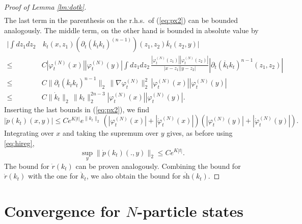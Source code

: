 \documentclass[11pt,a4paper]{article}
\newcommand{\ph}{\varphi_t^{(N)}}	%
\newcommand{\phdot}{\dot{\varphi}_t^{(N)}}	%
\begin{document}
\begin{proof}[Proof of Lemma \ref{lm:dotk}]
\[\begin{split}
 \end{split}
\]
The last term in the parenthesis on the r.h.s.\ of (\ref{eq:px2}) can be bounded analogously. 
The middle term, on the other hand is bounded in absolute value by
\[ \begin{split}
\Big|  \int dz_1 dz_2 & \, k_t (x,z_1) (\partial_t (\overline{k}_t k_t)^{(n-1)}) (z_1 ,z_2) \overline{k}_t (z_2 ,y ) \Big|
 \\ \leq \; & C |\ph (x)| |\ph(y)| \int dz_1 dz_2 \, \frac{ |\ph (z_1)| |\ph (z_2)|}{|x-z_1| |y-z_2|} |\partial_t (\overline{k}_t k_t)^{n-1} (z_1, z_2)|  \\
\leq \; &C \| \partial_t (\overline{k}_t k_t)^{n-1} \|_2 \, \| \nabla \ph \|_2^2 \,   |\ph (x)| |\ph(y)| 
\\
\leq \; &C \| \dot{k}_t \|_2 \, \| k_t \|_2^{2n-3} |\ph (x)| |\ph (y)| .
\end{split}\] 
Inserting the last bounds in (\ref{eq:px2}), we find
\[ |\dot{p} (k_t) (x,y)| \leq C e^{K |t|}  e^{\| k_t \|_2} \, (|\ph (x)| + |\phdot (x)|) (|\ph (y)| +|\phdot (y)|).  \]
Integrating over $x$ and taking the supremum over $y$ gives, as before using \eqref{eq:hireg},
\[ \sup_y \| \dot{p} (k_t) (.,y) \|_2 \leq C e^{K |t|}. \]
The bound for $\dot{r} (k_t)$ can be proven analogously. Combining the bound for $\dot{r} (k_t)$ with the one for $\dot{k}_t$, we also obtain the bound for $\dot{\text{sh}} (k_t)$.
\end{proof}


\section{Convergence for $N$-particle states}
\label{sec:Npart}
\end{document}
